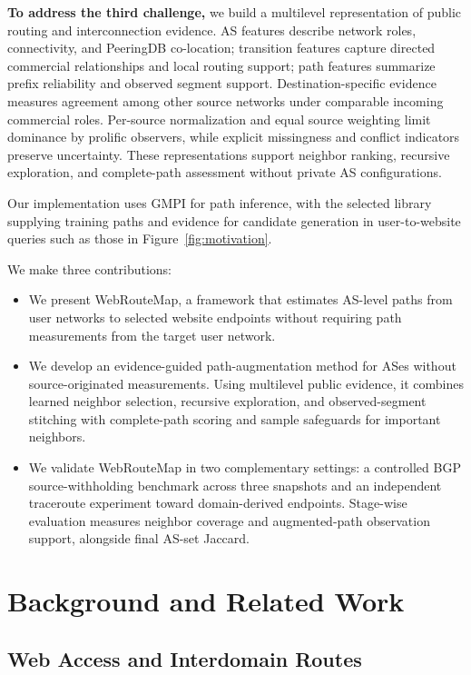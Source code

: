 \documentclass[sigconf,anonymous,review]{acmart}
\newcommand{\sys}{\mbox{WebRouteMap}\xspace}
\begin{document}
\textbf{To address the third challenge,} we build a multilevel
representation of public routing and interconnection evidence. AS
features describe network roles, connectivity, and PeeringDB co-location;
transition features capture directed commercial relationships and local
routing support; path features summarize prefix reliability and observed
segment support. Destination-specific evidence measures agreement among
other source networks under comparable incoming commercial roles.
Per-source normalization and equal source weighting limit dominance by
prolific observers, while explicit missingness and conflict indicators
preserve uncertainty. These representations support neighbor ranking,
recursive exploration, and complete-path assessment without private AS
configurations.

Our implementation uses GMPI for path inference, with the selected library
supplying training paths and evidence for candidate generation in
user-to-website queries such as those in Figure~\ref{fig:motivation}.

We make three contributions:
\begin{itemize}
\item We present \sys, a framework that estimates AS-level paths from user
networks to selected website endpoints without requiring path measurements
from the target user network.
\item We develop an evidence-guided path-augmentation method for ASes
without source-originated measurements. Using multilevel public evidence,
it combines learned neighbor selection, recursive exploration, and
observed-segment stitching with complete-path scoring and sample safeguards
for important neighbors.
\item We validate \sys in two complementary settings: a controlled BGP
source-withholding benchmark across three snapshots and an independent
traceroute experiment toward domain-derived endpoints. Stage-wise
evaluation measures neighbor coverage and augmented-path observation
support, alongside final AS-set Jaccard.
\end{itemize}

\section{Background and Related Work}
\label{sec:background}

\subsection{Web Access and Interdomain Routes}
\end{document}

